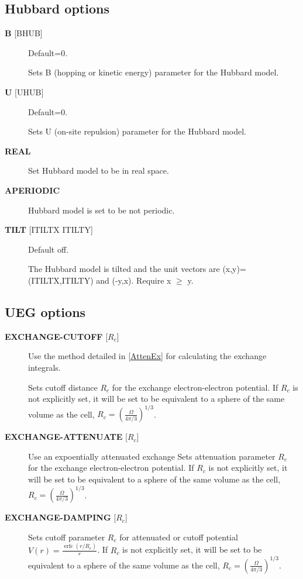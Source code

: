 \documentclass[openany,a4paper,10pt,english]{manual}
\begin{document}
\subsection{Hubbard options}
\begin{description}
\item[\textbf{B} {[}BHUB{]}] \leavevmode
Default=0.

Sets B (hopping or kinetic energy) parameter for the Hubbard model.

\item[\textbf{U} {[}UHUB{]}] \leavevmode
Default=0.

Sets U (on-site repulsion) parameter for the Hubbard model.

\item[\textbf{REAL}] \leavevmode
Set Hubbard model to be in real space.

\item[\textbf{APERIODIC}] \leavevmode
Hubbard model is set to be not periodic.

\item[\textbf{TILT} {[}ITILTX ITILTY{]}] \leavevmode
Default off.

The Hubbard model is tilted and the unit vectors are
(x,y)=(ITILTX,ITILTY) and (-y,x).  Require x $\ge$ y.

\end{description}


\subsection{UEG options}
\begin{description}
\item[\textbf{EXCHANGE-CUTOFF} {[}$R_c${]}] \leavevmode
Use the method detailed in \hyperlink{attenex}{{[}AttenEx{]}} for calculating the exchange
integrals.

Sets cutoff distance $R_c$ for the exchange electron-electron
potential.  If $R_c$ is not explicitly set, it will
be set to be equivalent to a sphere of the same volume as the cell,
$R_c=(\frac{\Omega}{4\pi/3})^{1/3}$.

\item[\textbf{EXCHANGE-ATTENUATE} {[}$R_c${]}] \leavevmode
Use an expoentially attenuated exchange
Sets attenuation parameter $R_c$ for the exchange electron-electron
potential.  If $R_c$ is not explicitly set, it will
be set to be equivalent to a sphere of the same volume as the cell,
$R_c=(\frac{\Omega}{4\pi/3})^{1/3}$.

\item[\textbf{EXCHANGE-DAMPING} {[}$R_c${]}] \leavevmode
Sets cutoff parameter $R_c$ for attenuated or cutoff potential
$V(r)=\frac{\operatorname{erfc}(r/R_c)}{r}$.  If $R_c$ is not explicitly set,
it will be set to be equivalent to a sphere of the same volume as the cell,
$R_c=(\frac{\Omega}{4\pi/3})^{1/3}$.

\end{description}
\end{document}
